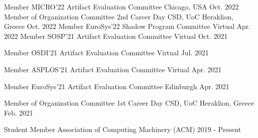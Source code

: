 \begin{cvhonors}
	\cvhonor
	{Member} %
	{MICRO'22 Artifact Evaluation Committee} %
	{Chicago, USA} %
	{Oct. 2022} %
	\cvhonor
	{Member of Organization Committee} %
	{2nd Career Day CSD, UoC} %
	{Heraklion, Greece} %
	{Oct. 2022} %
	\cvhonor
	{Member} %
	{EuroSys'22 Shadow Program Committee} %
	{Virtual} %
	{Apr. 2022} %
	\cvhonor
	{Member} %
	{SOSP'21 Artifact Evaluation Committee} %
	{Virtual} %
	{Oct. 2021} %

	\cvhonor
	{Member} %
	{OSDI'21 Artifact Evaluation Committee} %
	{Virtual} %
	{Jul. 2021} %

	\cvhonor
	{Member} %
	{ASPLOS'21 Artifact Evaluation Committee} %
	{Virtual} %
	{Apr. 2021} %


	\cvhonor
	{Member} %
	{EuroSys'21 Artifact Evaluation Committee} %
	{Edinburgh} %
	{Apr. 2021} %

	\cvhonor
	{Member of Organization Committee} %
	{1st Career Day CSD, UoC} %
	{Heraklion, Greece} %
	{Feb. 2021} %

	\cvhonor
	{Student Member} %
	{Association of Computing Machinery (ACM)} %
	{} %
	{2019 - Present} %


\end{cvhonors}
